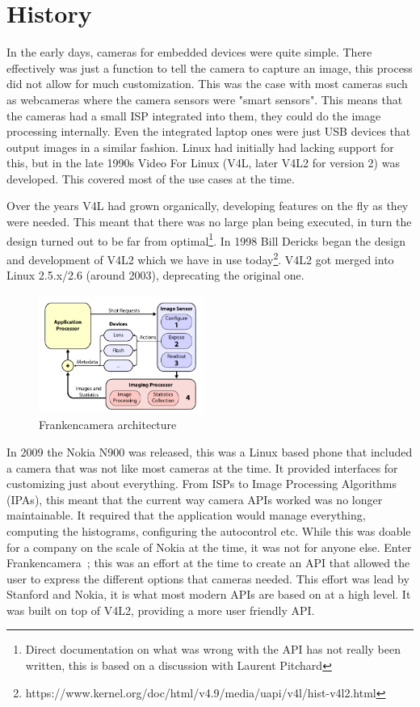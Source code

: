 \section{History}
In the early days, cameras for embedded devices were quite simple. There effectively was just a
function to tell the camera to capture an image, this process did not allow for
much customization. This was the case with most cameras such as webcameras where
the camera sensors were "smart sensors". This means that the cameras had a
small ISP integrated into them, they could do the image processing internally. Even
the integrated laptop ones were just USB devices that output images in a
similar fashion. Linux had initially had lacking support for this, but in the
late 1990s Video For Linux (V4L, later V4L2 for version 2) was developed. This
covered most of the use cases at the time.

Over the years V4L had grown organically, developing features on the fly as
they were needed. This meant that there was no large plan being executed, in
turn the design turned out to be far from optimal\footnote{Direct documentation
on what was wrong with the API has not really been written, this is based
on a discussion with Laurent Pitchard}. In 1998 Bill Dericks began the
design and development of V4L2 which we have in use today\footnote{https://www.kernel.org/doc/html/v4.9/media/uapi/v4l/hist-v4l2.html}.
V4L2 got merged into Linux 2.5.x/2.6 (around 2003), deprecating the
original one.

\begin{figure}
    \centering
    \includegraphics[width=0.48\textwidth]{figures/fcam_arch.png}
    \caption{Frankencamera architecture~\cite{adams2010frankencamera}}
    \label{fig:fcam_api}
\end{figure}

In 2009 the Nokia N900 was released, this was a Linux based phone that included a camera that was not
like most cameras at the time. It provided interfaces for customizing just
about everything. From ISPs to Image Processing Algorithms (IPAs), this meant
that the current way camera APIs worked was no longer maintainable. It
required that the application would manage everything, computing the
histograms, configuring the autocontrol etc. While this was doable for a
company on the scale of Nokia at the time, it was not for anyone else. Enter
Frankencamera~\cite{adams2010frankencamera}; this was an effort at the time
to create an API that allowed the user to express the different options that
cameras needed. This effort was lead by Stanford and Nokia, it is what most
modern APIs are based on at a high level. It was built on top of V4L2,
providing a more user friendly API.

